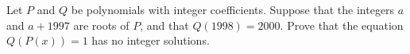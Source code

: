 Let $P$ and $Q$ be polynomials with integer coefficients. Suppose that the integers $a$ and $a+1997$ are roots of $P$,  and that $Q(1998)=2000$. Prove that the equation $Q(P(x))=1$ has no integer solutions.